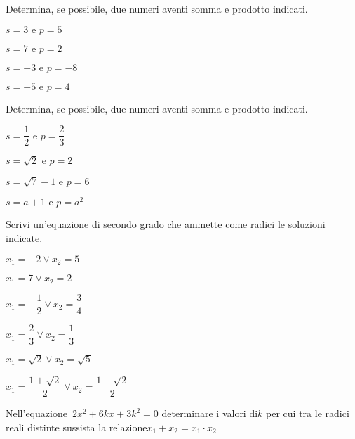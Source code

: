 \begin{esercizio}
 \label{ese:3.77}
Determina, se possibile, due numeri aventi somma e prodotto indicati.
\begin{multicols}{2}
\begin{enumeratea}
\item$s = 3 \text{ e } p = 5$
\item$s = 7 \text{ e } p = 2$
\item$s =-3 \text{ e } p =-8$
\item$s =-5 \text{ e } p = 4$
\end{enumeratea}
\end{multicols}
\end{esercizio}

\begin{esercizio}
 \label{ese:3.78}
Determina, se possibile, due numeri aventi somma e prodotto indicati.
\begin{multicols}{2}
\begin{enumeratea}
\item$s = \dfrac{1}{2} \text{ e } p = \dfrac{2}{3}$
\item$s = \sqrt{2} \text{ e } p = 2$
\item$s = \sqrt{7}-1 \text{ e } p = 6$
\item$s = a + 1 \text{ e } p= a^{2}$
\end{enumeratea}
\end{multicols}
\end{esercizio}

\begin{esercizio}
 \label{ese:3.79}
Scrivi un'equazione di secondo grado che ammette come radici le soluzioni 
indicate.
\begin{multicols}{2}
\begin{enumeratea}
\item$x_{1} =-2 \vee x_{2} = 5$
\item$x_{1} = 7 \vee x_{2} = 2$
\item$x_{1} =-\dfrac{1}{2} \vee x_{2} = \dfrac{3}{4}$
\item$x_{1} = \dfrac{2}{3} \vee x_{2} = \dfrac{1}{3}$
\item$x_{1} = \sqrt{2} \vee x_{2} = \sqrt{5}$
\item$x_{1} = \dfrac{1 + \sqrt{2}}{2} \vee x_{2} = \dfrac{1-\sqrt{2}}{2}$
\end{enumeratea}
\end{multicols}
\end{esercizio}

\begin{esercizio}
 \label{ese:3.80}
Nell'equazione~$2 x^{2} + 6 k x + 3 k^{2} = 0$ determinare i valori di$k$ 
per 
cui tra le radici reali distinte sussista la relazione$x_{1} + x_{2} = 
x_{1} 
\cdot x_{2}$
\end{esercizio}

